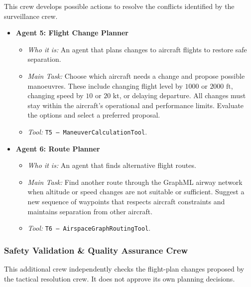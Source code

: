 This crew develops possible actions to resolve the conflicts identified by the surveillance crew.

\begin{itemize}[leftmargin=*]

    \item \textbf{Agent 5: Flight Change Planner}
    \begin{itemize}
        \item \textit{Who it is:} An agent that plans changes to aircraft flights to restore safe separation.
        \item \textit{Main Task:} Choose which aircraft needs a change and propose possible manoeuvres. These include changing flight level by $1000$ or $2000\text{ ft}$, changing speed by $10$ or $20\text{ kt}$, or delaying departure. All changes must stay within the aircraft's operational and performance limits. Evaluate the options and select a preferred proposal.
        \item \textit{Tool:} \texttt{T5 -- ManeuverCalculationTool}.
    \end{itemize}

    \item \textbf{Agent 6: Route Planner}
    \begin{itemize}
        \item \textit{Who it is:} An agent that finds alternative flight routes.
        \item \textit{Main Task:} Find another route through the GraphML airway network when altitude or speed changes are not suitable or sufficient. Suggest a new sequence of waypoints that respects aircraft constraints and maintains separation from other aircraft.
        \item \textit{Tool:} \texttt{T6 -- AirspaceGraphRoutingTool}.
    \end{itemize}

\end{itemize}


\subsubsection{Safety Validation \& Quality Assurance Crew}

This additional crew independently checks the flight-plan changes proposed by the tactical resolution crew. It does not approve its own planning decisions.

